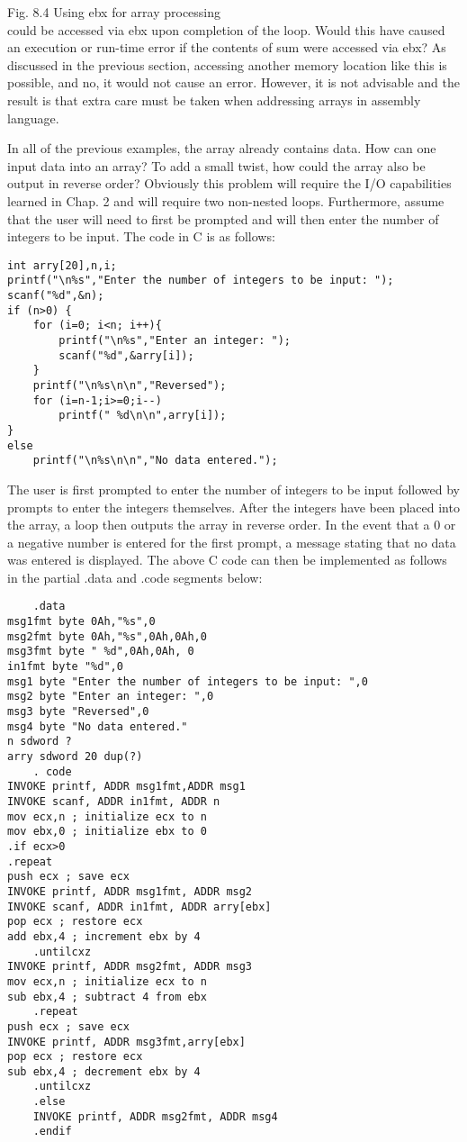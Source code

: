 \documentclass[10pt]{article}
\begin{document}
Fig. 8.4 Using ebx for array processing\\
could be accessed via ebx upon completion of the loop. Would this have caused an execution or run-time error if the contents of sum were accessed via ebx? As discussed in the previous section, accessing another memory location like this is possible, and no, it would not cause an error. However, it is not advisable and the result is that extra care must be taken when addressing arrays in assembly language.

In all of the previous examples, the array already contains data. How can one input data into an array? To add a small twist, how could the array also be output in reverse order? Obviously this problem will require the I/O capabilities learned in Chap. 2 and will require two non-nested loops. Furthermore, assume that the user will need to first be prompted and will then enter the number of integers to be input. The code in C is as follows:

\begin{verbatim}
int arry[20],n,i;
printf("\n%s","Enter the number of integers to be input: ");
scanf("%d",&n);
if (n>0) {
    for (i=0; i<n; i++){
        printf("\n%s","Enter an integer: ");
        scanf("%d",&arry[i]);
    }
    printf("\n%s\n\n","Reversed");
    for (i=n-1;i>=0;i--)
        printf(" %d\n\n",arry[i]);
}
else
    printf("\n%s\n\n","No data entered.");
\end{verbatim}

The user is first prompted to enter the number of integers to be input followed by prompts to enter the integers themselves. After the integers have been placed into the array, a loop then outputs the array in reverse order. In the event that a 0 or a negative number is entered for the first prompt, a message stating that no data was entered is displayed. The above C code can then be implemented as follows in the partial .data and .code segments below:

\begin{verbatim}
    .data
msg1fmt byte 0Ah,"%s",0
msg2fmt byte 0Ah,"%s",0Ah,0Ah,0
msg3fmt byte " %d",0Ah,0Ah, 0
in1fmt byte "%d",0
msg1 byte "Enter the number of integers to be input: ",0
msg2 byte "Enter an integer: ",0
msg3 byte "Reversed",0
msg4 byte "No data entered."
n sdword ?
arry sdword 20 dup(?)
    . code
INVOKE printf, ADDR msg1fmt,ADDR msg1
INVOKE scanf, ADDR in1fmt, ADDR n
mov ecx,n ; initialize ecx to n
mov ebx,0 ; initialize ebx to 0
.if ecx>0
.repeat
push ecx ; save ecx
INVOKE printf, ADDR msg1fmt, ADDR msg2
INVOKE scanf, ADDR in1fmt, ADDR arry[ebx]
pop ecx ; restore ecx
add ebx,4 ; increment ebx by 4
    .untilcxz
INVOKE printf, ADDR msg2fmt, ADDR msg3
mov ecx,n ; initialize ecx to n
sub ebx,4 ; subtract 4 from ebx
    .repeat
push ecx ; save ecx
INVOKE printf, ADDR msg3fmt,arry[ebx]
pop ecx ; restore ecx
sub ebx,4 ; decrement ebx by 4
    .untilcxz
    .else
    INVOKE printf, ADDR msg2fmt, ADDR msg4
    .endif
\end{verbatim}
\end{document}
